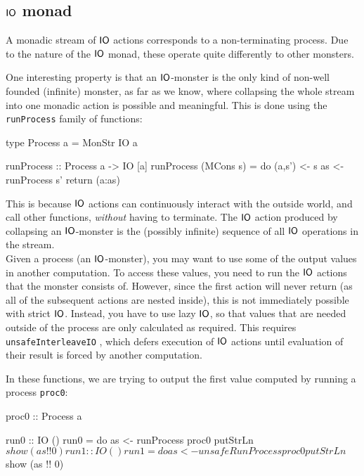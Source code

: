 \subsection{$\mathsf{IO}$ monad}

A monadic stream of $\mathsf{IO}$ actions corresponds to a non-terminating process. Due to the nature of the $\mathsf{IO}$ monad, these operate quite differently to other monsters.

One interesting property is that an $\mathsf{IO}$-monster is the only kind of non-well founded (infinite) monster, as far as we know, where collapsing the whole stream into one monadic action is possible and meaningful. This is done using the \verb+runProcess+ family of functions:

\begin{haskell}
type Process a = MonStr IO a

runProcess :: Process a -> IO [a]
runProcess (MCons s) = do (a,s') <- s
                          as     <- runProcess s'
                          return (a:as)
\end{haskell}

This is because $\mathsf{IO}$ actions can continuously interact with the outside world, and call other functions, \emph{without} having to terminate. The $\mathsf{IO}$ action produced by collapsing an $\mathsf{IO}$-monster is the (possibly infinite) sequence of all $\mathsf{IO}$ operations in the stream. \\

Given a process (an $\mathsf{IO}$-monster), you may want to use some of the output values in another computation. To access these values, you need to run the $\mathsf{IO}$ actions that the monster consists of. However, since the first action will never return (as all of the subsequent actions are nested inside), this is not immediately possible with strict $\mathsf{IO}$. Instead, you have to use lazy $\mathsf{IO}$, so that values that are needed outside of the process are only calculated as required. This requires \verb+unsafeInterleaveIO+ \cite{unsafe_io}, which defers execution of $\mathsf{IO}$ actions until evaluation of their result is forced by another computation. 

In these functions, we are trying to output the first value computed by running a process \verb+proc0+:

\begin{haskell}
proc0 :: Process a

run0 :: IO ()
run0 = do as <- runProcess proc0
          putStrLn $ show (as !! 0)

run1 :: IO ()
run1 = do as <- unsafeRunProcess proc0
          putStrLn $ show (as !! 0)
\end{haskell}

